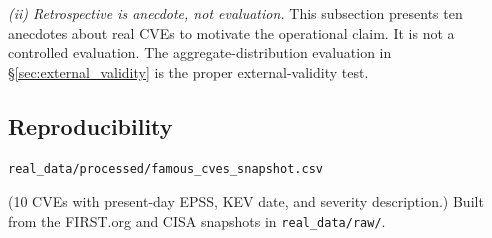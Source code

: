 \textit{(ii) Retrospective is anecdote, not evaluation.}
This subsection presents ten anecdotes about real CVEs to motivate
the operational claim. It is not a controlled evaluation. The
aggregate-distribution evaluation in \S\ref{sec:external_validity}
is the proper external-validity test.

\subsection{Reproducibility}

\begin{verbatim}
real_data/processed/famous_cves_snapshot.csv
\end{verbatim}
\noindent (10 CVEs with present-day EPSS, KEV date, and severity
description.) Built from the FIRST.org and CISA snapshots in
\texttt{real\_data/raw/}.
